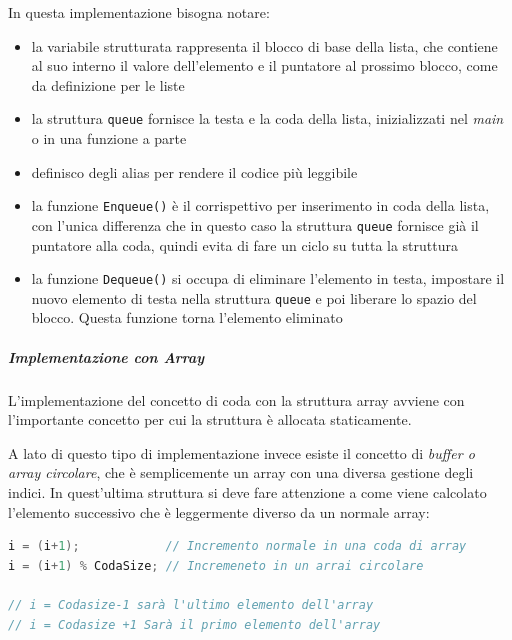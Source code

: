 \documentclass[
  paper=a4,
  oneside  ,captions=tableheading
]{scrbook}
\newcommand{\passthrough}[1]{#1}
\providecommand{\tightlist}{%
  \setlength{\itemsep}{0pt}\setlength{\parskip}{0pt}}
\begin{document}
In questa implementazione bisogna notare:

\begin{itemize}
\tightlist
\item
  la variabile strutturata rappresenta il blocco di base della lista,
  che contiene al suo interno il valore dell'elemento e il puntatore al
  prossimo blocco, come da definizione per le liste
\item
  la struttura \passthrough{\lstinline!queue!} fornisce la testa e la
  coda della lista, inizializzati nel \emph{main} o in una funzione a
  parte
\item
  definisco degli alias per rendere il codice più leggibile
\item
  la funzione \passthrough{\lstinline!Enqueue()!} è il corrispettivo per
  inserimento in coda della lista, con l'unica differenza che in questo
  caso la struttura \passthrough{\lstinline!queue!} fornisce già il
  puntatore alla coda, quindi evita di fare un ciclo su tutta la
  struttura
\item
  la funzione \passthrough{\lstinline!Dequeue()!} si occupa di eliminare
  l'elemento in testa, impostare il nuovo elemento di testa nella
  struttura \passthrough{\lstinline!queue!} e poi liberare lo spazio del
  blocco. Questa funzione torna l'elemento eliminato
\end{itemize}

\hypertarget{implementazione-con-array-1}{%
\subparagraph{\texorpdfstring{Implementazione con
\emph{Array}}{Implementazione con Array}}\label{implementazione-con-array-1}}

L'implementazione del concetto di coda con la struttura array avviene
con l'importante concetto per cui la struttura è allocata staticamente.

A lato di questo tipo di implementazione invece esiste il concetto di
\emph{buffer o array circolare}, che è semplicemente un array con una
diversa gestione degli indici. In quest'ultima struttura si deve fare
attenzione a come viene calcolato l'elemento successivo che è
leggermente diverso da un normale array:

\begin{lstlisting}[language={C++}]
i = (i+1);            // Incremento normale in una coda di array
i = (i+1) % CodaSize; // Incremeneto in un arrai circolare

// i = Codasize-1 sarà l'ultimo elemento dell'array
// i = Codasize +1 Sarà il primo elemento dell'array
\end{lstlisting}
\end{document}
